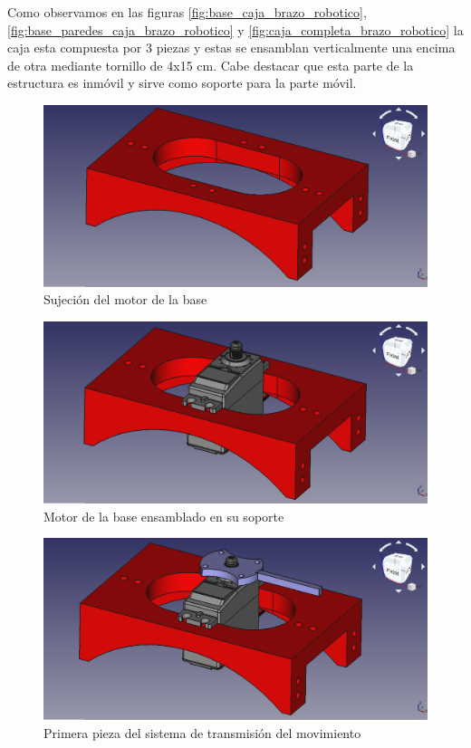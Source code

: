 Como observamos en las figuras \ref{fig:base_caja_brazo_robotico}, \ref{fig:base_paredes_caja_brazo_robotico} y \ref{fig:caja_completa_brazo_robotico} la caja esta compuesta por 3 piezas y estas se ensamblan verticalmente una encima de otra mediante tornillo de 4x15 cm.
Cabe destacar que esta parte de la estructura es inmóvil y sirve como soporte para la parte móvil.

\begin{figure}[H]
    \centering 
    \includegraphics[width=1\linewidth]{pictures/MotorHold.png}
    \caption{Sujeción del motor de la base}
    \label{fig:sujección_motor_base}
\end{figure}

\begin{figure}[H]
    \centering 
    \includegraphics[width=1\linewidth]{pictures/MotorHoldYMotor.png}
    \caption{Motor de la base ensamblado en su soporte}
    \label{fig:motor_ensamblado_soporte}
\end{figure}

\begin{figure}[H]
    \centering 
    \includegraphics[width=1\linewidth]{pictures/MotorMasPrimeraPieza.png}
    \caption{Primera pieza del sistema de transmisión del movimiento}
    \label{fig:primera_pieza_sistema_transmision}
\end{figure}

